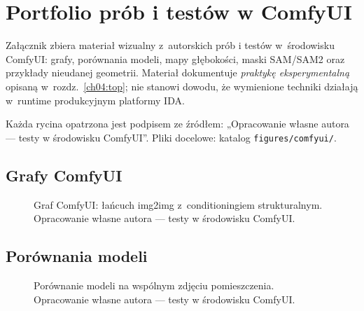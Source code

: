 \chapter{Portfolio prób i testów w ComfyUI}
\label{app:g:top}

Załącznik zbiera materiał wizualny z~autorskich prób i testów w~środowisku ComfyUI: grafy, porównania modeli, mapy głębokości, maski SAM/SAM2 oraz przykłady nieudanej geometrii. Materiał dokumentuje \emph{praktykę eksperymentalną} opisaną w~rozdz.~\ref{ch04:top}; nie stanowi dowodu, że wymienione techniki działają w~runtime produkcyjnym platformy IDA.

Każda rycina opatrzona jest podpisem ze źródłem: „Opracowanie własne autora --- testy w środowisku ComfyUI”. Pliki docelowe: katalog \texttt{figures/comfyui/}.

\section{Grafy ComfyUI}
\label{app:g:sec:graphs}

\begin{figure}[htbp]
  \centering
  \caption{Graf ComfyUI: łańcuch img2img z~conditioningiem strukturalnym.
  Opracowanie własne autora --- testy w środowisku ComfyUI.}
  \label{app:g:fig:graph}
\end{figure}


\section{Porównania modeli}
\label{app:g:sec:models}

\begin{figure}[htbp]
  \centering
  \caption{Porównanie modeli na wspólnym zdjęciu pomieszczenia.
  Opracowanie własne autora --- testy w środowisku ComfyUI.}
  \label{app:g:fig:models}
\end{figure}

